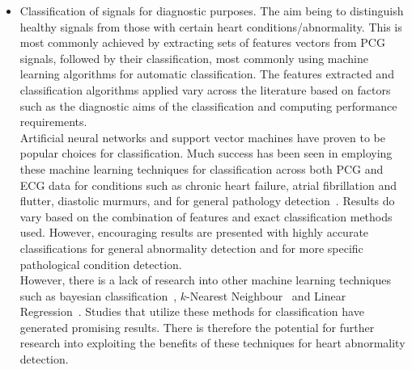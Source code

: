 \documentclass[titlepage]{scrartcl}
\begin{document}
\begin{itemize}
    \item Classification of signals for diagnostic purposes.  The aim being to
        distinguish healthy signals from those with certain heart
        conditions/abnormality. This is most commonly achieved by extracting
        sets of features vectors from PCG signals, followed by their
        classification, most commonly using machine learning algorithms for
        automatic classification. The features extracted and classification
        algorithms applied vary across the literature based on factors such as
        the diagnostic aims of the classification and computing performance
        requirements.\\

        Artificial neural networks and support vector machines have proven to
        be popular choices for classification. Much success has been seen in
        employing these machine learning techniques for classification across
        both PCG and ECG data for conditions such as chronic heart failure,
        atrial fibrillation and flutter, diastolic murmurs, and for general
        pathology detection~\parencite{Cathers1995, Wu1995, Bung2000,
        Lubaib2016, Maji2014, Ari2010, Maglogiannis2009}. Results do vary based
        on the combination of features and exact classification methods used.
        However, encouraging results are presented with highly accurate
        classifications for general abnormality detection and for more specific
        pathological condition detection.\\

        However, there is a lack of research into other machine learning
        techniques such as bayesian classification~\parencite{Lubaib2016},
        $k$-Nearest Neighbour~\parencite{Quiceno-Manrique2010a, Lubaib2016} and
        Linear Regression~\parencite{Orhan2013}. Studies that utilize these
        methods for classification have generated promising results.  There is
        therefore the potential for further research into exploiting the
        benefits of these techniques for heart abnormality detection.\\


\end{itemize}
\end{document}
